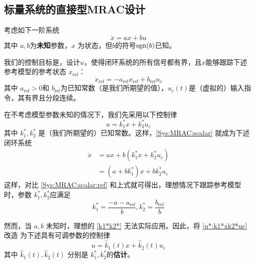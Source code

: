 \subsection{标量系统的直接型MRAC设计}\label{sec:MRAC:scalar:direct}
考虑如下一阶系统
\begin{equation}
  \dot{x} = a  x + b  u \label{Sys:MRAC:scalar}
\end{equation}
其中 $a, b$为{\bf 未知}参数，$x$ 为状态，但$b$的符号$\operatorname{sgn}(b)$已知。

我们的控制目标是，设计$u$，使得闭环系统的所有信号都有界，且$x$能够跟踪下述参考模型的参考状态 $x_{\ensuremath{\operatorname{ref}}}$：
\begin{equation}
  \dot{x}_{\ensuremath{\operatorname{ref}}} = -
  a_{\ensuremath{\operatorname{ref}}} x_{\ensuremath{\operatorname{ref}}} +
  b_{\ensuremath{\operatorname{ref}}} u_c \label{Sys:MRAC:scalar:ref}
\end{equation}
其中 $a_{\ensuremath{\operatorname{ref}}} > 0$和
$b_{\ensuremath{\operatorname{ref}}}$为已知常数（是我们所期望的值），$u_c
(t)$是（虚拟的）输入指令，其有界且分段连续。

在不考虑模型参数未知的情况下，我们先采用以下控制律
\begin{equation}
  u = k^{\ast}_1 x + k^{\ast}_2 u_c \label{u*:k1*xk2*uc}
\end{equation}
其中 $k^{\ast}_1, k^{\ast}_2$ 是（我们所期望的）已知常数。这样，\eqref{Sys:MRAC:scalar} 就成为下述闭环系统 
\begin{align*}
  \dot{x} & = a  x + b  (k^{\ast}_1 x + k^{\ast}_2 u_c)\\
  & = (a + b  k^{\ast}_1)  x + b  k^{\ast}_2 u_c
\end{align*}
这样，对比 \eqref{Sys:MRAC:scalar:ref} 和上式就可得出，理想情况下跟踪参考模型时，参数
$k^{\ast}_1, k^{\ast}_2$应满足
\begin{equation}
  k^{\ast}_1 = \frac{-a - a_{\ensuremath{\operatorname{ref}}}}{b}, k^{\ast}_2 =
  \frac{b_{\ensuremath{\operatorname{ref}}}}{b} \label{k1*k2*}
\end{equation}

然而，当 $a, b$ 未知时，理想的 \eqref{k1*k2*} 无法实际应用。因此，将 \eqref{u*:k1*xk2*uc} 改造
为下述具有可调参数的控制律
\begin{equation}
  u = \hat{k}_1 (t) x + \hat{k}_2 (t) u_c \label{u:k1xk2uc}
\end{equation}
其中 $\hat{k}_1 (t), \hat{k}_2 (t)$ 分别是 $k^{\ast}_1,k^{\ast}_2$的{\bf 估计}。

